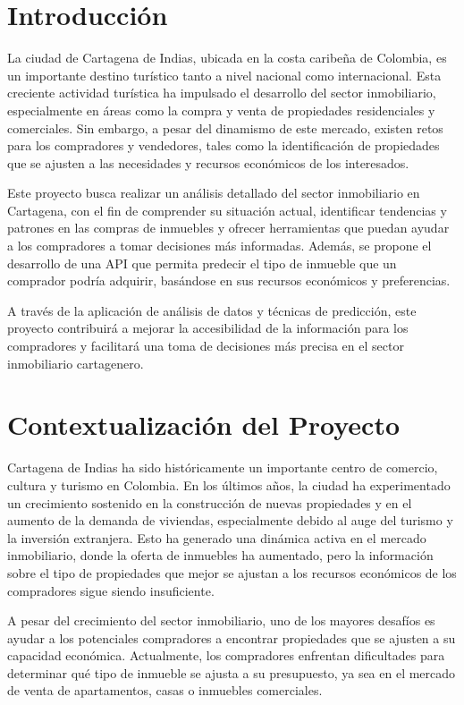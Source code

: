 \documentclass[12pt,a4paper]{article}
\begin{document}
\newpage

\section{Introducción}
La ciudad de Cartagena de Indias, ubicada en la costa caribeña de Colombia, es un importante destino turístico tanto a nivel nacional como internacional. Esta creciente actividad turística ha impulsado el desarrollo del sector inmobiliario, especialmente en áreas como la compra y venta de propiedades residenciales y comerciales. Sin embargo, a pesar del dinamismo de este mercado, existen retos para los compradores y vendedores, tales como la identificación de propiedades que se ajusten a las necesidades y recursos económicos de los interesados.

Este proyecto busca realizar un análisis detallado del sector inmobiliario en Cartagena, con el fin de comprender su situación actual, identificar tendencias y patrones en las compras de inmuebles y ofrecer herramientas que puedan ayudar a los compradores a tomar decisiones más informadas. Además, se propone el desarrollo de una API que permita predecir el tipo de inmueble que un comprador podría adquirir, basándose en sus recursos económicos y preferencias.

A través de la aplicación de análisis de datos y técnicas de predicción, este proyecto contribuirá a mejorar la accesibilidad de la información para los compradores y facilitará una toma de decisiones más precisa en el sector inmobiliario cartagenero.

\section{Contextualización del Proyecto}
Cartagena de Indias ha sido históricamente un importante centro de comercio, cultura y turismo en Colombia. En los últimos años, la ciudad ha experimentado un crecimiento sostenido en la construcción de nuevas propiedades y en el aumento de la demanda de viviendas, especialmente debido al auge del turismo y la inversión extranjera. Esto ha generado una dinámica activa en el mercado inmobiliario, donde la oferta de inmuebles ha aumentado, pero la información sobre el tipo de propiedades que mejor se ajustan a los recursos económicos de los compradores sigue siendo insuficiente.

A pesar del crecimiento del sector inmobiliario, uno de los mayores desafíos es ayudar a los potenciales compradores a encontrar propiedades que se ajusten a su capacidad económica. Actualmente, los compradores enfrentan dificultades para determinar qué tipo de inmueble se ajusta a su presupuesto, ya sea en el mercado de venta de apartamentos, casas o inmuebles comerciales.
\end{document}

